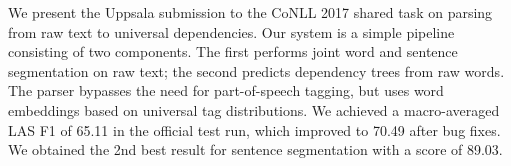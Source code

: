 We present the Uppsala submission to the CoNLL 2017 shared task on parsing from raw text to universal dependencies. Our system is a simple pipeline consisting of two components. The first performs joint word and sentence segmentation on raw text; the second predicts dependency trees from raw words. The parser bypasses the need for part-of-speech tagging, but uses word embeddings based on universal tag distributions. We achieved a macro-averaged LAS F1 of 65.11 in the official test run, which improved to 70.49 after bug fixes. We obtained the 2nd best result for sentence segmentation with a score of 89.03.
